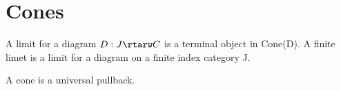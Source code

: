 \section{Cones}

\begin{definition}
  A limit for a diagram $D: J \rtarw C $ is a terminal object in Cone(D). A finite limet is a limit for a diagram on a finite index category J.
\end{definition}

A cone is a universal pullback.


